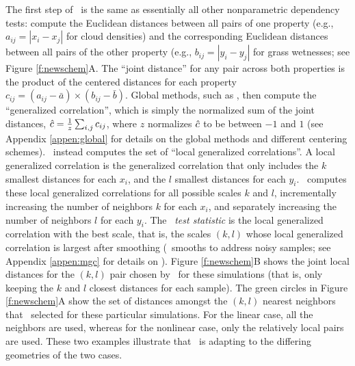 \documentclass[11pt]{extarticle}
\begin{document}
The first step of \Mgc~is the same as essentially all other nonparametric dependency tests:
compute the Euclidean distances between all pairs of one property {(e.g., $a_{ij}=|x_i-x_j|$ for cloud densities)} and the corresponding Euclidean distances between all pairs of the other property {(e.g., $b_{ij}=|y_i - y_j|$ for grass wetnesses;} see Figure \ref{f:newschem}{\color{magenta}A}.
The ``joint distance'' for any pair across both properties is the product of the centered distances for each property $c_{ij}=(a_{ij}-\bar{a}) \times (b_{ij}-\bar{b})$.
Global methods, such as \Dcorr, then compute the ``generalized correlation'', which is simply the normalized sum of the joint distances, $\hat{c}= \frac{1}{z}\sum_{i,j} c_{ij}$, where $z$ normalizes $\hat{c}$ to be between $-1$ and $1$ (see Appendix \ref{appen:global} for details on the global methods and different centering schemes).
\Mgc~instead computes the set of  ``local generalized correlations''.
A local generalized correlation is the generalized correlation that only includes the $k$ smallest distances for each $x_i$, and the $l$ smallest distances for each  $y_i$.
\Mgc~computes these local generalized correlations for all possible scales $k$ and $l$, incrementally increasing the number of neighbors $k$ for each $x_i$, and separately increasing the number of neighbors $l$ for each $y_i$.
The \Mgc~\emph{test statistic} is the local generalized correlation with the best scale, that is, the scales $(k,l)$  whose local generalized correlation is largest after smoothing (\Mgc~smooths to address noisy samples; see  Appendix  \ref{appen:mgc} for details on \Mgc).
Figure \ref{f:newschem}{\color{magenta}B} shows the joint local distances  for the $(k,l)$ pair chosen by \Mgc~for these simulations (that is, only keeping the $k$ and $l$ closest distances for each sample).
The green circles in Figure \ref{f:newschem}{\color{magenta}A} show the set of distances amongst the $(k,l)$ nearest neighbors that \Mgc~selected for these particular simulations.
For the linear case, all the neighbors are used, whereas for the nonlinear case, only the relatively local pairs are used.
These two examples  illustrate that \Mgc~is adapting to the differing geometries of the two cases.
\end{document}
